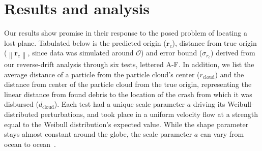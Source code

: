 \documentclass[pre,12pt]{revtex4-1}
\begin{document}
\section{Results and analysis}\label{Results}

Our results show promise in their response to the posed problem of locating a lost plane. Tabulated below is the predicted origin ($\mathbf{r}_c$), distance from true origin ($\left\lVert\mathbf{r}_c\right\rVert$, since data was simulated around $\mathcal{O}$) and error bound ($\sigma_{r_c}$) derived from our reverse-drift analysis through six tests, lettered A-F. In addition, we list the average distance of a particle from the particle cloud's center ($r_\text{cloud}$) and the distance from center of the particle cloud from the true origin, representing the linear distance from found debris to the location of the crash from which it was disbursed ($d_\text{cloud}$). Each test had a unique scale parameter $a$ driving its Weibull-distributed perturbations, and took place in a uniform velocity flow at a strength equal to the Weibull distribution's expected value. While the shape parameter stays almost constant around the globe, the scale parameter $a$ can vary from ocean to ocean~\cite{SurfaceCurrents}.
\end{document}
